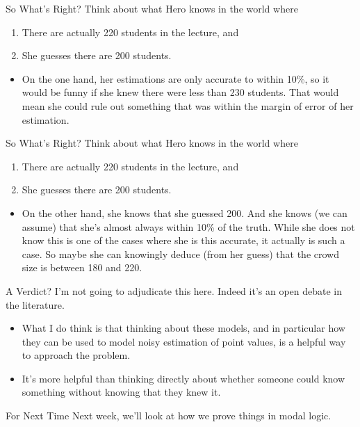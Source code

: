 \documentclass[
  ignorenonframetext,
]{beamer}
\providecommand{\tightlist}{%
  \setlength{\itemsep}{0pt}\setlength{\parskip}{0pt}}
\renewcommand{\,}{\text{, }}
\begin{document}
\begin{frame}{So What's Right?}
\protect\hypertarget{so-whats-right}{}
Think about what Hero knows in the world where

\begin{enumerate}
\tightlist
\item
  There are actually 220 students in the lecture, and
\item
  She guesses there are 200 students. \pause 
\end{enumerate}

\begin{itemize}
\tightlist
\item
  On the one hand, her estimations are only accurate to within 10\%, so
  it would be funny if she knew there were less than 230 students. That
  would mean she could rule out something that was within the margin of
  error of her estimation.
\end{itemize}
\end{frame}

\begin{frame}{So What's Right?}
\protect\hypertarget{so-whats-right-1}{}
Think about what Hero knows in the world where

\begin{enumerate}
\tightlist
\item
  There are actually 220 students in the lecture, and
\item
  She guesses there are 200 students. \pause 
\end{enumerate}

\begin{itemize}
\tightlist
\item
  On the other hand, she knows that she guessed 200. And she knows (we
  can assume) that she's almost always within 10\% of the truth. While
  she does not know this is one of the cases where she is this accurate,
  it actually is such a case. So maybe she can knowingly deduce (from
  her guess) that the crowd size is between 180 and 220.
\end{itemize}
\end{frame}

\begin{frame}{A Verdict?}
\protect\hypertarget{a-verdict}{}
I'm not going to adjudicate this here. Indeed it's an open debate in the
literature.

\begin{itemize}
\tightlist
\item
  What I do think is that thinking about these models, and in particular
  how they can be used to model noisy estimation of point values, is a
  helpful way to approach the problem.
\item
  It's more helpful than thinking directly about whether someone could
  know something without knowing that they knew it.
\end{itemize}
\end{frame}

\begin{frame}{For Next Time}
\protect\hypertarget{for-next-time}{}
Next week, we'll look at how we prove things in modal logic.
\end{frame}
\end{document}
